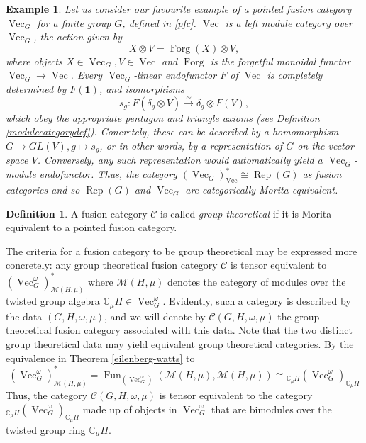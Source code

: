 \documentclass[11pt]{book}
\theoremstyle{Rem}
\newtheorem{Expl}[theorem]{Example}
\theoremstyle{definition}
\newtheorem{Def}[theorem]{Definition}
\numberwithin{equation}{section}
\newcommand\ot{\otimes}
\newcommand\Rep{\operatorname{Rep}}
\newcommand\Vect{\operatorname{Vec}}
\newcommand\Fun{\operatorname{Fun}}
\newcommand\Forg{\operatorname{Forg}}
\newcommand\CC{\mathbb C}
\newcommand\kk{\mathbb C}
\newcommand\M{\mathcal{M}}
\newcommand\C{\mathcal C}
\newcommand{\ra}\rightarrow
\newcommand{\xra}\xrightarrow
\newcommand\one{\mathbf{1}}
\begin{document}
\begin{Expl}\rm
Let us consider our favourite example of a pointed fusion category $\Vect_G$ for a finite group $G$, defined in \ref{pfc}. $\Vect$ is a left module category over $\Vect_G$, the action given by \begin{equation}
	X\ot V = \Forg(X)\ot V,
\end{equation} where objects $X\in \Vect_G, V\in \Vect$ and $\Forg$ is the forgetful monoidal functor $\Vect_G \ra \Vect$. Every $\Vect_G$-linear endofunctor $F$ of $\Vect$ is completely determined by $F(\one)$, and isomorphisms \begin{equation}
	s_g: F(\delta_g\ot V) \xra{\sim}\delta_g\ot F(V),
\end{equation} which obey the appropriate pentagon and triangle axioms (see Definition \ref{modulecategorydef}). Concretely, these can be described by a homomorphism $G\ra GL(V), g\mapsto s_g$, or in other words, by a representation of $G$ on the vector space $V$. Conversely, any such representation would automatically yield a $\Vect_G$-module endofunctor. Thus, the category $(\Vect_G)^*_{\Vect}\cong \Rep(G)$ as fusion categories and so $\Rep(G)$ and $\Vect_G$ are categorically Morita equivalent.
\end{Expl} 
\begin{Def}

A fusion category $\mathcal{C}$ is called \textit{group theoretical} if it is Morita equivalent to a pointed fusion category.
\end{Def}
 The criteria for a fusion category to be group theoretical may be expressed more concretely: any group theoretical fusion category $\C$ is tensor equivalent to $(\Vect^\omega_G)^*_{\M(H, \mu)}$ where $\M(H, \mu)$ denotes the category of modules over the twisted group algebra $\kk_\mu H\in \Vect_G^\omega$.  Evidently, such a category is described by the data $(G, H, \omega, \mu)$, and we will denote by $\C(G, H, \omega, \mu)$ the group theoretical fusion category associated with this data. Note that the two distinct group theoretical data may yield equivalent group theoretical categories.
By the equivalence in Theorem \ref{eilenberg-watts} to \begin{equation}\label{gtbimod}
	(\Vect^\omega_G)^*_{\M(H, \mu)} = \Fun_{(\Vect^\omega_G)}(\M(H, \mu), \M(H, \mu)) \cong {}_{\CC_\mu H}(\Vect^\omega_G)_{\CC_\mu H}
\end{equation} 
Thus, the category $\C(G, H, \omega, \mu)$ is tensor equivalent to the category ${}_{\CC_\mu H}(\Vect^\omega_G)_{\CC_\mu H}$ made up of objects in $\Vect^\omega_G$ that are bimodules over the twisted group ring $\mathbb{C}_\mu H$. 
\end{document}
